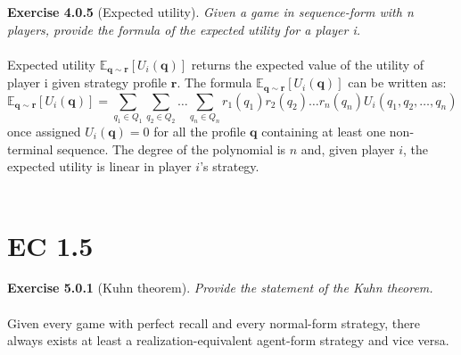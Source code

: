 \textbf{Exercise 4.0.5} (Expected utility). \textit{Given a game in sequence-form with n players, provide the formula of the
expected utility for a player i.}\\\\
Expected utility $\mathbb{E}_{\mathbf{q} \sim \mathbf{r}}\left[U_{i}(\mathbf{q})\right]$ returns the expected value of the utility of player i given strategy profile $\mathbf{r}$. The formula $\mathbb{E}_{\mathbf{q} \sim \mathbf{r}}\left[U_{i}(\mathbf{q})\right]$ can be written as:
$$
\mathbb{E}_{\mathbf{q} \sim \mathbf{r}}\left[U_{i}(\mathbf{q})\right]=\sum_{q_{1} \in Q_{1}} \sum_{q_{2} \in Q_{2}} \ldots \sum_{q_{n} \in Q_{n}} r_{1}\left(q_{1}\right) r_{2}\left(q_{2}\right) \ldots r_{n}\left(q_{n}\right) U_{i}\left(q_{1}, q_{2}, \ldots, q_{n}\right)
$$
once assigned $U_{i}(\mathbf{q})=0$ for all the profile $\mathbf{q}$ containing at least one non-terminal sequence. The degree of the polynomial is $n$ and, given player $i$, the expected utility is linear in player $i$'s strategy.\\\\

\section{EC 1.5}
\textbf{Exercise 5.0.1} (Kuhn theorem). \textit{Provide the statement of the Kuhn theorem.}\\\\
Given every game with perfect recall and every normal-form strategy, there always exists at least a realization-equivalent agent-form strategy and vice versa.\\\\

